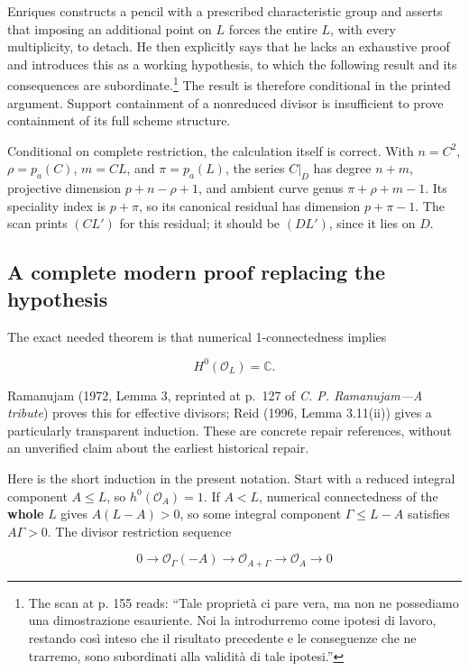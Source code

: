 Enriques constructs a pencil with a prescribed characteristic group and asserts that imposing an additional point on \(L\) forces the entire \(L\), with every multiplicity, to detach. He then explicitly says that he lacks an exhaustive proof and introduces this as a working hypothesis, to which the following result and its consequences are subordinate.\footnote{The scan at p. 155 reads: ``Tale proprietà ci pare vera, ma non ne possediamo una dimostrazione esauriente. Noi la introdurremo come ipotesi di lavoro, restando così inteso che il risultato precedente e le conseguenze che ne trarremo, sono subordinati alla validità di tale ipotesi.''} The result is therefore conditional in the printed argument. Support containment of a nonreduced divisor is insufficient to prove containment of its full scheme structure.

Conditional on complete restriction, the calculation itself is correct. With \(n=C^2\), \(\rho=p_a(C)\), \(m=CL\), and \(\pi=p_a(L)\), the series \(C|_D\) has degree \(n+m\), projective dimension \(p+n-\rho+1\), and ambient curve genus \(\pi+\rho+m-1\). Its speciality index is \(p+\pi\), so its canonical residual has dimension \(p+\pi-1\). The scan prints \((CL')\) for this residual; it should be \((DL')\), since it lies on \(D\).

\subsection{A complete modern proof replacing the hypothesis}

The exact needed theorem is that numerical 1-connectedness implies

\[
H^0(\mathcal O_L)=\mathbb C.
\]

Ramanujam (1972, Lemma 3, reprinted at p.~127 of \emph{C. P. Ramanujam---A tribute}) proves this for effective divisors; Reid (1996, Lemma 3.11(ii)) gives a particularly transparent induction. These are concrete repair references, without an unverified claim about the earliest historical repair.

Here is the short induction in the present notation. Start with a reduced integral component \(A\le L\), so \(h^0(\mathcal O_A)=1\). If \(A<L\), numerical connectedness of the \textbf{whole} \(L\) gives \(A(L-A)>0\), so some integral component \(\Gamma\le L-A\) satisfies \(A\Gamma>0\). The divisor restriction sequence

\[
0\to\mathcal O_\Gamma(-A)\to\mathcal O_{A+\Gamma}
\to\mathcal O_A\to0
\]

